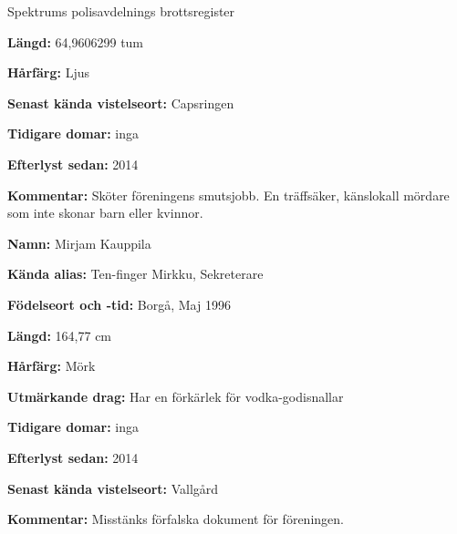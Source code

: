 \documentclass{spektraklet}
\begin{document}
\begin{artikel}{Spektrums polisavdelnings
brottsregister}{}
\begin{twocolumns}
\textbf{Längd:} 64,9606299 tum

\textbf{Hårfärg:} Ljus

\textbf{Senast kända vistelseort:} Capsringen

\textbf{Tidigare domar:} inga

\textbf{Efterlyst sedan:} 2014

\textbf{Kommentar:} Sköter föreningens smutsjobb. En träffsäker, känslokall mördare som inte skonar barn eller kvinnor.




\textbf{Namn:} Mirjam Kauppila

\textbf{Kända alias:} Ten-finger Mirkku, Sekreterare

\textbf{Födelseort och -tid:} Borgå, Maj 1996

\textbf{Längd:} 164,77 cm

\textbf{Hårfärg:} Mörk

\textbf{Utmärkande drag:} Har en förkärlek för vodka-godisnallar

\textbf{Tidigare domar:} inga

\textbf{Efterlyst sedan:} 2014

\textbf{Senast kända vistelseort:} Vallgård

\textbf{Kommentar:} Misstänks förfalska dokument för föreningen.

\end{twocolumns}
\end{artikel}
\end{document}

